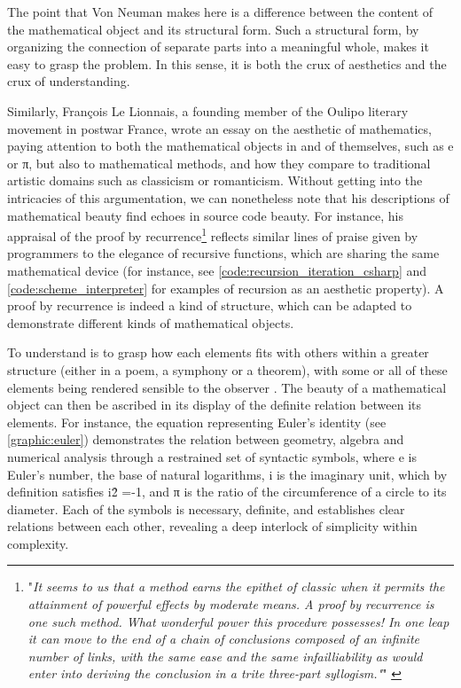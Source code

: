The point that Von Neuman makes here is a difference between the content of the mathematical object and its structural form. Such a structural form, by organizing the connection of separate parts into a meaningful whole, makes it easy to grasp the problem. In this sense, it is both the crux of aesthetics and the crux of understanding.

Similarly, François Le Lionnais, a founding member of the Oulipo literary movement in postwar France, wrote an essay on the aesthetic of mathematics, paying attention to both the mathematical objects in and of themselves, such as e or π, but also to mathematical methods, and how they compare to traditional artistic domains such as classicism or romanticism. Without getting into the intricacies of this argumentation, we can nonetheless note that his descriptions of mathematical beauty find echoes in source code beauty. For instance, his appraisal of the proof by recurrence\footnote{"\emph{It seems to us that a method earns the epithet of classic when it permits the attainment of powerful effects by moderate means. A proof by recurrence is one such method. What wonderful power this procedure possesses! In one leap it can move to the end of a chain of conclusions composed of an infinite number of links, with the same ease and the same infailliability as would enter into deriving the conclusion in a trite three-part syllogism."}" \citep{lelionnais_great_1971}} reflects similar lines of praise given by programmers to the elegance of recursive functions, which are sharing the same mathematical device (for instance, see \ref{code:recursion_iteration_csharp} and \ref{code:scheme_interpreter} for examples of recursion as an aesthetic property). A proof by recurrence is indeed a kind of structure, which can be adapted to demonstrate different kinds of mathematical objects.

To understand is to grasp how each elements fits with others within a greater structure (either in a poem, a symphony or a theorem), with some or all of these elements being rendered sensible to the observer \citep{cellucci_mathematical_2015}. The beauty of a mathematical object can then be ascribed in its display of the definite relation between its elements. For instance, the equation representing Euler's identity (see \ref{graphic:euler}) demonstrates the relation between geometry, algebra and numerical analysis through a restrained set of syntactic symbols, where e is Euler's number, the base of natural logarithms, i is the imaginary unit, which by definition satisfies i\^{2} =-1, and π is the ratio of the circumference of a circle to its diameter. Each of the symbols is necessary, definite, and establishes clear relations between each other, revealing a deep interlock of simplicity within complexity.

